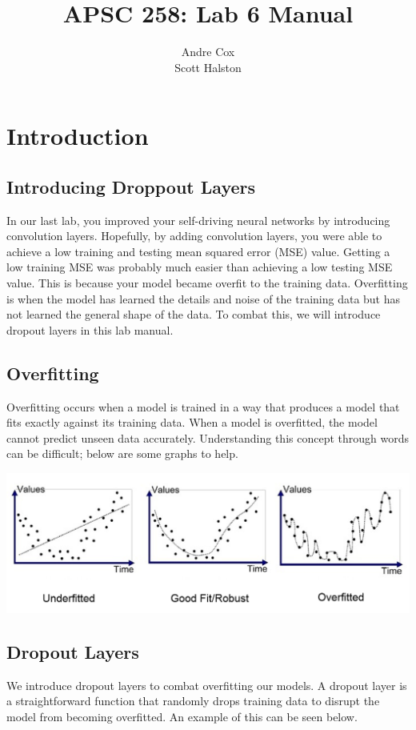 \documentclass[11pt]{report}
\title{APSC 258: Lab 6 Manual}
\author{Andre Cox  \\ Scott Halston}
\begin{document}
\maketitle
\tableofcontents

\clearpage

\chapter{Introduction}
\section{Introducing Droppout Layers}
In our last lab, you improved your self-driving neural networks by introducing convolution layers. Hopefully, by adding convolution layers, you were able to achieve a low training and testing mean squared error (MSE) value. Getting a low training MSE was probably much easier than achieving a low testing MSE value. This is because your model became overfit to the training data. Overfitting is when the model has learned the details and noise of the training data but has not learned the general shape of the data. To combat this, we will introduce dropout layers in this lab manual.

\section{Overfitting}
Overfitting occurs when a model is trained in a way that produces a model that fits exactly against its training data. When a model is overfitted, the model cannot predict unseen data accurately. Understanding this concept through words can be difficult; below are some graphs to help.

\begin{center}
    \includegraphics[scale=0.325]{./images/overfitexample.png}
\end{center}

\section{Dropout Layers}
We introduce dropout layers to combat overfitting our models. A dropout layer is a straightforward function that randomly drops training data to disrupt the model from becoming overfitted. An example of this can be seen below.
\end{document}
